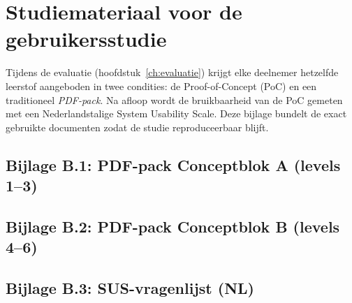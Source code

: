 
\usepackage{pdfpages}

\chapter{Studiemateriaal voor de gebruikersstudie}
\label{ch:bijlage-materialen}

Tijdens de evaluatie (hoofdstuk~\ref{ch:evaluatie}) krijgt elke deelnemer hetzelfde leerstof aangeboden in twee condities: de Proof-of-Concept (PoC) en een traditioneel \emph{PDF-pack}. Na afloop wordt de bruikbaarheid van de PoC gemeten met een Nederlandstalige System Usability Scale.
Deze bijlage bundelt de exact gebruikte documenten zodat de studie reproduceerbaar blijft.

\section*{Bijlage B.1: PDF-pack Conceptblok A (levels 1--3)}


\section*{Bijlage B.2: PDF-pack Conceptblok B (levels 4--6)}


\section*{Bijlage B.3: SUS-vragenlijst (NL)}

